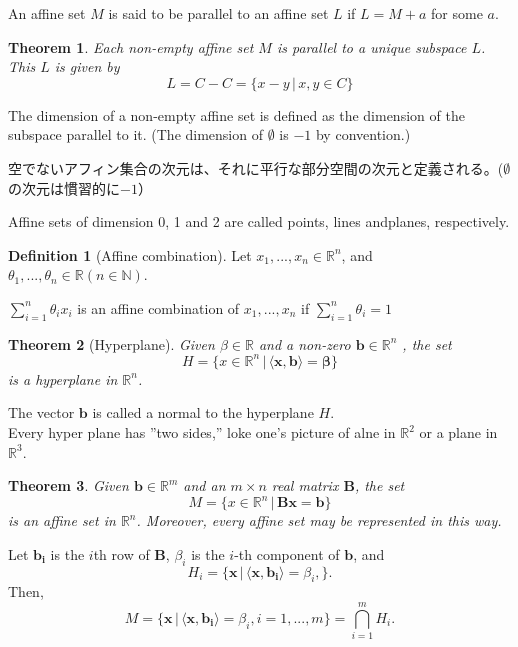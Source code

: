 \documentclass{jsarticle}
\newtheorem{thm}{Theorem}[section]
\theoremstyle{definition}
\newtheorem{dfn}{Definition}[section]
\begin{document}
An affine set $M$ is said to be parallel to an affine set $L$ if $L = M + a$ for some $a$.
\\

\begin{thm}
Each non-empty affine set $M$ is parallel to a unique subspace
$L$. This $L$ is given by
\[
L = C - C = \{ x - y \,| \, x, y  \in C\} 
\]
\end{thm}

The dimension of a non-empty affine set is defined as the
dimension of the subspace parallel to it. (The dimension of
$\emptyset$ is $-1$ by convention.)

空でないアフィン集合の次元は、それに平行な部分空間の次元と定義される。($\emptyset$の次元は慣習的に$-1$）

Affine sets of dimension 0, 1 and 2 are called points, lines andplanes, respectively.\\



\begin{dfn}[Affine combination]
Let $x_1,...,x_n \in \mathbb{R}^n $, and $\theta_1,..., \theta_n\in \mathbb{R} (n \in \mathbb{N})$.

$\sum \limits_{i=1}^n \theta_i x_i $ is an affine
combination of $x_1, ..., x_n$ if $\sum \limits_{i=1}^n \theta_i= 1$ 
\end{dfn}



\begin{thm}[Hyperplane]
Given $\beta \in \mathbb{R}$ and a non-zero $\bm{b} \in
\mathbb{R}^n$ , the set
\[
H = \{ x \in \mathbb{R}^n\,| \,\langle \bm{x}, \bm{b} \rangle =
\bm{\beta } \}
\]
is a hyperplane in $\mathbb{R}^n$.
\end{thm}


The vector $\bm{b}$ is called a normal to the hyperplane $H$.\\
Every hyper plane has ''two sides,'' loke one's picture of alne
in $\mathbb{R}^2$ or a plane in $\mathbb{R}^3$.\\


\begin{thm} 
Given $\bm{b} \in \mathbb{R}^m$ and an $m \times n$ real matrix
$\bm{B}$, the set
\[
M = \{ x \in \mathbb{R}^n \,| \, \bm{B} \bm{x} = \bm{b}  \}
\]
is an affine set in $\mathbb{R}^n$. 
Moreover, every affine set may be represented in this way.
\end{thm}



Let $\bm{b_i}$ is the $i$th row of $\bm{B}$, $\beta_i$ is the
$i$-th component of $\bm{b}$, and
\[
H_i = \{ \bm{x} \, | \, \langle \bm{x}, \bm{b_i} \rangle =
\beta_i, \} .
\]
Then, 
\[
M = \{ \bm{x} \, | \, \langle \bm{x}, \bm{b_i} \rangle =
\beta_i, i = 1, ... , m\} = \bigcap_{i=1}^{m}{H_i} .
\]
\end{document}
